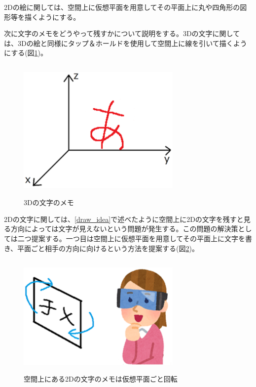 \documentclass[11pt,a4j, titlepage]{jarticle} %
\begin{document}
2Dの絵に関しては、空間上に仮想平面を用意してその平面上に丸や四角形の図形等を描くようにする。

次に文字のメモをどうやって残すかについて説明をする。3Dの文字に関しては、3Dの絵と同様にタップ＆ホールドを使用して空間上に線を引いて描くようにする(図\ref{fig:3d_moji})。

\begin{figure}[H]
  \begin{center}
    \includegraphics[clip,height=7.0cm,width=8.0cm]{./3d_moji.eps}
    \caption{3Dの文字のメモ}
    \label{fig:3d_moji}
  \end{center}
\end{figure}

2Dの文字に関しては、\ref{draw_idea}で述べたように空間上に2Dの文字を残すと見る方向によっては文字が見えないという問題が発生する。この問題の解決策としては二つ提案する。一つ目は空間上に仮想平面を用意してその平面上に文字を書き、平面ごと相手の方向に向けるという方法を提案する(図\ref{fig:memo_kaiten})。

\begin{figure}[H]
  \begin{center}
    \includegraphics[clip,height=6.0cm,width=8.0cm]{./memo_kaiten.eps}
    \caption{空間上にある2Dの文字のメモは仮想平面ごと回転}
    \label{fig:memo_kaiten}
  \end{center}
\end{figure}
\end{document}
